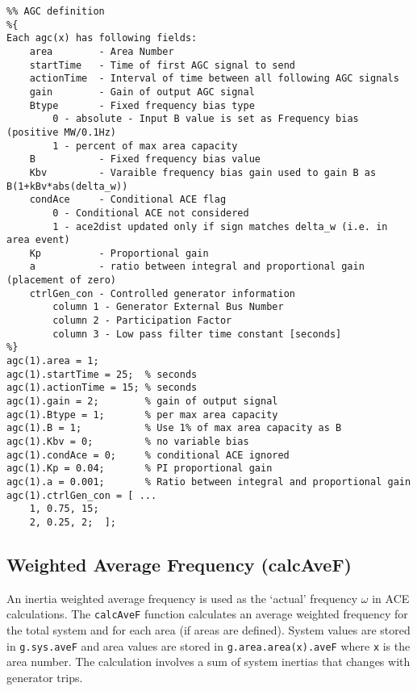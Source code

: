 \begin{verbatim}
%% AGC definition
%{ 
Each agc(x) has following fields:
    area        - Area Number 
    startTime   - Time of first AGC signal to send
    actionTime  - Interval of time between all following AGC signals
    gain        - Gain of output AGC signal
    Btype       - Fixed frequency bias type
        0 - absolute - Input B value is set as Frequency bias (positive MW/0.1Hz)
        1 - percent of max area capacity
    B           - Fixed frequency bias value
    Kbv         - Varaible frequency bias gain used to gain B as B(1+kBv*abs(delta_w))
    condAce     - Conditional ACE flag
        0 - Conditional ACE not considered
        1 - ace2dist updated only if sign matches delta_w (i.e. in area event)
    Kp          - Proportional gain
    a           - ratio between integral and proportional gain (placement of zero)
    ctrlGen_con - Controlled generator information
        column 1 - Generator External Bus Number
        column 2 - Participation Factor
        column 3 - Low pass filter time constant [seconds]
%}
agc(1).area = 1;
agc(1).startTime = 25;  % seconds
agc(1).actionTime = 15; % seconds
agc(1).gain = 2;        % gain of output signal
agc(1).Btype = 1;       % per max area capacity
agc(1).B = 1;           % Use 1% of max area capacity as B
agc(1).Kbv = 0;         % no variable bias
agc(1).condAce = 0;     % conditional ACE ignored
agc(1).Kp = 0.04;       % PI proportional gain
agc(1).a = 0.001;       % Ratio between integral and proportional gain
agc(1).ctrlGen_con = [ ...
    1, 0.75, 15;
    2, 0.25, 2;  ];
\end{verbatim}




\subsection{Weighted Average Frequency (calcAveF)} 
An inertia weighted average frequency is used as the `actual' frequency $\omega$ in ACE calculations.
The \verb|calcAveF| function calculates an average weighted frequency for the total system and for each area (if areas are defined).
System values are stored in \verb|g.sys.aveF| and area values are stored in \verb|g.area.area(x).aveF| where \verb|x| is the area number.
The calculation involves a sum of system inertias that changes with generator trips.


